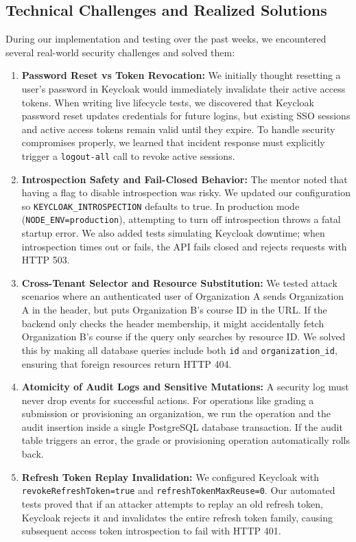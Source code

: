 \documentclass{article}
\begin{document}
\subsection*{Technical Challenges and Realized Solutions}
During our implementation and testing over the past weeks, we encountered several real-world security challenges and solved them:
\begin{enumerate}
    \item \textbf{Password Reset vs Token Revocation:} We initially thought resetting a user's password in Keycloak would immediately invalidate their active access tokens. When writing live lifecycle tests, we discovered that Keycloak password reset updates credentials for future logins, but existing SSO sessions and active access tokens remain valid until they expire. To handle security compromises properly, we learned that incident response must explicitly trigger a \texttt{logout-all} call to revoke active sessions.
    \item \textbf{Introspection Safety and Fail-Closed Behavior:} The mentor noted that having a flag to disable introspection was risky. We updated our configuration so \texttt{KEYCLOAK\_INTROSPECTION} defaults to true. In production mode (\texttt{NODE\_ENV=production}), attempting to turn off introspection throws a fatal startup error. We also added tests simulating Keycloak downtime; when introspection times out or fails, the API fails closed and rejects requests with HTTP 503.
    \item \textbf{Cross-Tenant Selector and Resource Substitution:} We tested attack scenarios where an authenticated user of Organization A sends Organization A in the header, but puts Organization B's course ID in the URL. If the backend only checks the header membership, it might accidentally fetch Organization B's course if the query only searches by resource ID. We solved this by making all database queries include both \texttt{id} and \texttt{organization\_id}, ensuring that foreign resources return HTTP 404.
    \item \textbf{Atomicity of Audit Logs and Sensitive Mutations:} A security log must never drop events for successful actions. For operations like grading a submission or provisioning an organization, we run the operation and the audit insertion inside a single PostgreSQL database transaction. If the audit table triggers an error, the grade or provisioning operation automatically rolls back.
    \item \textbf{Refresh Token Replay Invalidation:} We configured Keycloak with \texttt{revokeRefreshToken=true} and \texttt{refreshTokenMaxReuse=0}. Our automated tests proved that if an attacker attempts to replay an old refresh token, Keycloak rejects it and invalidates the entire refresh token family, causing subsequent access token introspection to fail with HTTP 401.
\end{enumerate}
\end{document}
